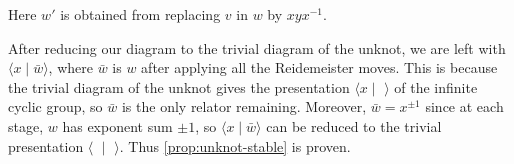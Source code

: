 Here $w'$ is obtained from replacing $v$ in $w$ by $xyx^{-1}$.


After reducing our diagram to the trivial diagram of the unknot, we are left with $\langle x \mid \bar w\rangle$, where $\bar w$ is $w$ after applying all the Reidemeister moves. This is because the trivial diagram of the unknot gives the presentation $\langle x\mid \,\,\rangle$ of the infinite cyclic group, so $\bar w$ is the only relator remaining.  Moreover, $\bar w = x^{\pm1}$ since at each stage, $w$ has exponent sum $\pm 1$, so $\langle x \mid \bar w\rangle$ can be reduced to the trivial presentation $\langle \,\, \mid \,\, \rangle$. Thus \cref{prop:unknot-stable} is proven.

